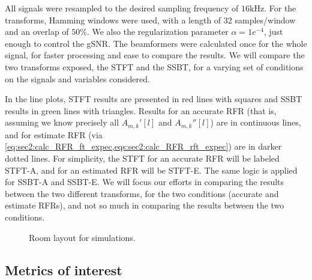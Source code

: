 All signals were resampled to the desired sampling frequency of $16\si{\kilo\hertz}$. For the transforms, Hamming windows were used, with a length of 32 samples/window and an overlap of $50\%$. We also the regularization parameter $\alpha = 1e^{-4}$, just enough to control the gSNR. The beamformers were calculated once for the whole signal, for faster processing and ease to compare the results. We will compare the two transforms exposed, the STFT and the SSBT, for a varying set of conditions on the signals and variables considered.

In the line plots, STFT results are presented in red lines with squares and SSBT results in green lines with triangles. Results for an accurate RFR (that is, assuming we know precisely all $A_{m,k}'[l]$ and $A_{m,k}''[l]$) are in continuous lines, and for estimate RFR (via \cref{eq:sec2:calc_RFR_ft_expec,eqs:sec2:calc_RFR_rft_expec}) are in darker dotted lines. For simplicity, the STFT for an accurate RFR will be labeled STFT-A, and for an estimated RFR will be STFT-E. The same logic is applied for SSBT-A and SSBT-E. We will focus our efforts in comparing the results between the two different transforms, for the two conditions (accurate and estimate RFRs), and not so much in comparing the results between the two conditions.

\begin{figure}[!ht]
	\centering
	
	\caption{Room layout for simulations.}
	\label{fig:room_layout}
\end{figure}
%

\subsection{Metrics of interest}

